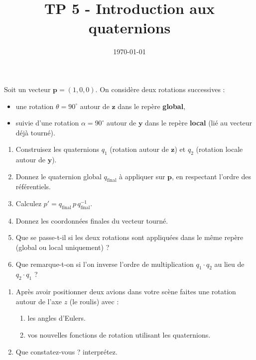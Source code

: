 \documentclass[a4paper,12pt]{article}
\title{TP 5 - Introduction aux quaternions}
\author{}
\date{\today}
\begin{document}
\makeonlytitle



Soit un vecteur \( \mathbf{p} = (1, 0, 0) \). On considère deux rotations successives :
\begin{itemize}
  \item une rotation \( \theta = 90^\circ \) autour de \( \mathbf{z} \) dans le repère \textbf{global},
  \item suivie d’une rotation \( \alpha = 90^\circ \) autour de \( \mathbf{y} \) dans le repère \textbf{local} (lié au vecteur déjà tourné).
\end{itemize}

\begin{enumerate}
          \item Construisez les quaternions \( q_1 \) (rotation autour de \( \mathbf{z} \)) et \( q_2 \) (rotation locale autour de \( \mathbf{y} \)).
          \item Donnez le quaternion global \( q_{\text{final}} \) à appliquer sur \( \mathbf{p} \), en respectant l’ordre des référentiels.
          \item Calculez \( p' = q_{\text{final}}\,p\,q_{\text{final}}^{-1} \).
          \item Donnez les coordonnées finales du vecteur tourné.
          \item Que se passe-t-il si les deux rotations sont appliquées dans le même repère (global ou local uniquement) ?
          \item Que remarque-t-on si l’on inverse l’ordre de multiplication \( q_1 \cdot q_2 \) au lieu de \( q_2 \cdot q_1 \) ?
\end{enumerate}

\label{exo:impl}

\begin{enumerate}
	\item Après avoir positionner deux avions dans votre scène faites une rotation autour de l'axe $z$ (le roulis) avec :
    \begin{enumerate}
        \item les angles d'Eulers.
        \item vos nouvelles fonctions de rotation utilisant les quaternions.        
    \end{enumerate}
    \item Que constatez-vous ? interprétez.
\end{enumerate}
\end{document}
